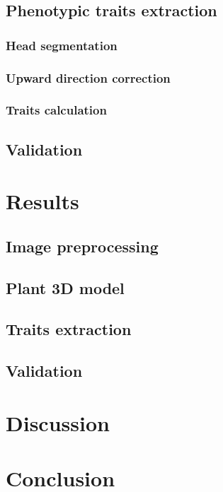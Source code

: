 \subsection{Phenotypic traits extraction}



\subsubsection{Head segmentation}

\subsubsection{Upward direction correction}

\subsubsection{Traits calculation}


\subsection{Validation}




\section{Results}

\subsection{Image preprocessing}



\subsection{Plant 3D model}



\subsection{Traits extraction}




\subsection{Validation}



\section{Discussion}



\section{Conclusion}